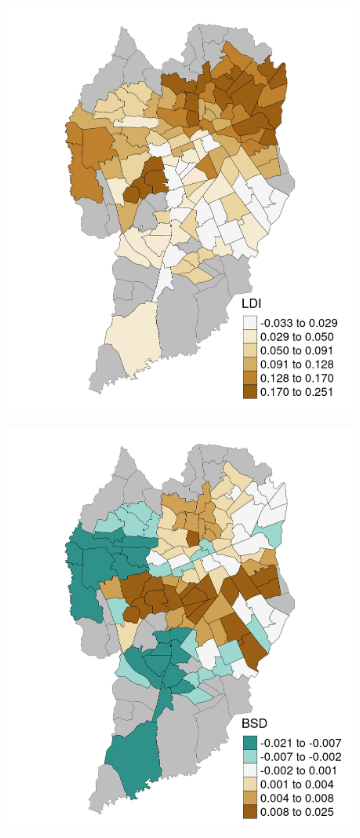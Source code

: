 \begin{figure}[!htbp]
    \centering\footnotesize
    \captionsetup{font=footnotesize}
    \caption{LDI AND BSD COEFFICIENT ESTIMATES}
    \begin{subfigure}{0.5\textwidth}
        \includegraphics{fig/LDI.png}
    \end{subfigure}%
    \begin{subfigure}{0.5\textwidth}
        \includegraphics{fig/BSD.png}

\end{subfigure}
\end{figure}
